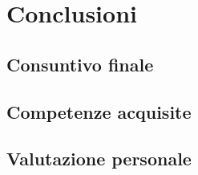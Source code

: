 \chapter{Conclusioni}
\label{chap:conclusioni}

\section{Consuntivo finale}

\section{Competenze acquisite}

\section{Valutazione personale}